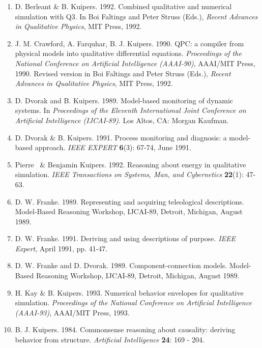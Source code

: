  \begin{enumerate}\small

  \item D. Berleant \& B. Kuipers.  1992.  Combined qualitative and
numerical simulation with Q3.  In Boi Faltings and Peter
Struss (Eds.), {\em Recent Advances in Qualitative Physics}, MIT Press,
1992.

  \item
 J. M. Crawford, A. Farquhar, B. J. Kuipers.  1990.
QPC:  a compiler from physical models into qualitative differential equations.
{\it Proceedings of the National Conference on Artificial Intelligence (AAAI-90)},
AAAI/MIT Press, 1990.  Revised version in 
Boi Faltings and Peter Struss (Eds.), {\em Recent Advances
in Qualitative Physics}, MIT Press, 1992.

  \item
D. Dvorak and B. Kuipers.  1989.  Model-based monitoring of dynamic systems.
In {\it Proceedings of the Eleventh International Joint Conference on 
Artificial Intelligence (IJCAI-89)}.  Los Altos, CA:  Morgan Kaufman.

  \item
 D. Dvorak \& B. Kuipers.  1991.
Process monitoring and diagnosis:  a model-based approach.
{\it IEEE EXPERT} {\bf 6}(3):  67-74, June 1991.

  \item Pierre \Fouche\ \& Benjamin Kuipers.  1992.
Reasoning about energy in qualitative simulation.
{\it IEEE Transactions on Systems, Man, and Cybernetics} {\bf 22}(1):  47-63.

  \item
D. W. Franke.  1989.  Representing and acquiring teleological descriptions.
Model-Based Reasoning Workshop, IJCAI-89, Detroit, Michigan, August 1989.

  \item
D. W. Franke.  1991.  Deriving and using descriptions of purpose.
{\it IEEE Expert}, April 1991, pp. 41-47.

  \item
D. W. Franke and D. Dvorak.  1989.  Component-connection models.
Model-Based Reasoning Workshop, IJCAI-89, Detroit, Michigan, August 1989.

  \item 
 H. Kay \& B. Kuipers.  1993.  Numerical behavior envelopes for qualitative simulation.
{\it Proceedings of the National Conference on Artificial Intelligence (AAAI-93)},
AAAI/MIT Press, 1993.

  \item
B. J. Kuipers.  1984.  Commonsense reasoning about causality:
deriving behavior from structure.
{\it Artificial Intelligence} {\bf 24}: 169 - 204.


\end{enumerate}
